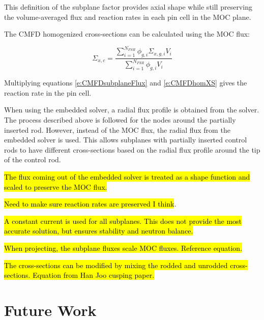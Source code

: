 This definition of the subplane factor provides axial shape while still preserving the volume-averaged flux and reaction rates in each pin cell in the MOC plane.

The CMFD homogenized cross-sections can be calculated using the MOC flux:

\begin{equation}\label{e:CMFDhomXS}
\Sigma_{x,c} = \frac{\sum_{i=1}^{N_{FSR}} \phi_{g,i}\Sigma_{x,g,i}V_i}{\sum_{i=1}^{N_{FSR}} \phi_{g,i}V_i}
\end{equation}

Multiplying equations \ref{e:CMFDsubplaneFlux} and \ref{e:CMFDhomXS} gives the reaction rate in the pin cell.

When using the embedded solver, a radial flux profile is obtained from the solver.  The process described above is followed for the nodes around the partially inserted rod.  However, instead of the MOC flux, the radial flux from the embedded solver is used.  This allows subplanes with partially inserted control rods to have different cross-sections based on the radial flux profile around the tip of the control rod.

\hl{The flux coming out of the embedded solver is treated as a shape function and scaled to preserve the MOC flux.}

\hl{Need to make sure reaction rates are preserved I think}.

\hl{A constant current is used for all subplanes.  This does not provide the most accurate solution, but ensures stability and neutron balance.}

\hl{When projecting, the subplane fluxes scale MOC fluxes.  Reference equation.}

\hl{The cross-sections can be modified by mixing the rodded and unrodded cross-sections.  Equation from Han Joo cusping paper.}

\section{Future Work}